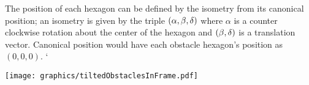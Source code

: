 The position of each hexagon can be defined by the isometry from its canonical position; an isometry is given by the triple $\left( \alpha, \beta, \delta \right)$ where $\alpha$ is a counter clockwise rotation about the center of the hexagon and $\left( \beta,\delta \right)$ is a translation vector.%
Canonical position would have each obstacle hexagon's position as $(0,0,0)$.
				`

\begin{minipage}{\linewidth}
\begin{center}
\texttt{[image: graphics/tiltedObstaclesInFrame.pdf]}
\label{fig:tiltedObstaclesInFrame.pdf}
\end{center}
\end{minipage}
